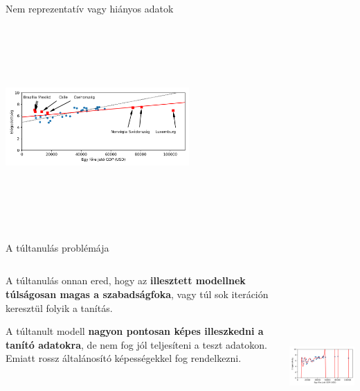 \documentclass[english, aspectratio=169]{beamer}
\begin{document}
\begin{frame}{Nem reprezentatív vagy hiányos adatok}
{\begin{columns}
\begin{column}{.5\textwidth}
\begin{center}
\includegraphics[width=7cm, height=7cm, keepaspectratio]{images/regularization_3.png}
\end{center}
\end{column}
\end{columns}}
\end{frame}

\begin{frame}{A túltanulás problémája}
\begin{columns}
\begin{column}{.5\textwidth}
A túltanulás onnan ered, hogy az \textbf{illesztett modellnek túlságosan magas a szabadságfoka}, vagy túl sok iteráción keresztül folyik a tanítás.\par\smallskip
A túltanult modell \textbf{nagyon pontosan képes illeszkedni a tanító adatokra}, de nem fog jól teljesíteni a teszt adatokon. Emiatt rossz általánosító képességekkel fog rendelkezni. 
\end{column}
\begin{column}{.5\textwidth}
\begin{center}
\includegraphics[width=7cm, height=7cm, keepaspectratio]{images/regularization_4.png}
\end{center}
\end{column}
\end{columns}
\end{frame}
\end{document}
